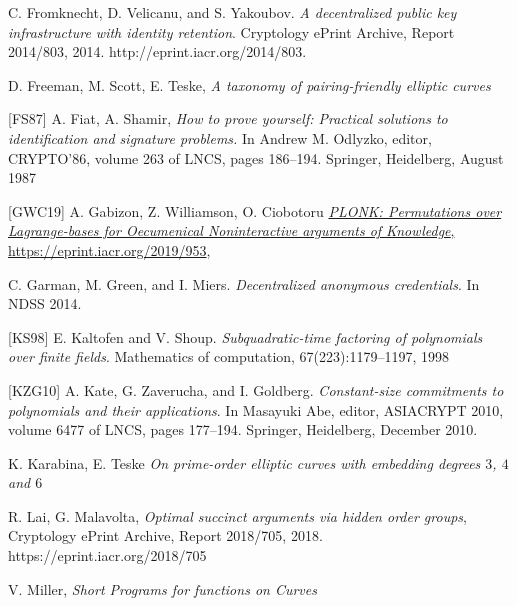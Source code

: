 \documentclass[11pt, lettersize, notitlepage, leqno, footskip=0.6cm]{article}
\newcommand{\noin}{\noindent}
\numberwithin{equation}{section}
\begin{document}
\noin [FVY14] C. Fromknecht, D. Velicanu, and S. Yakoubov. \textit{A decentralized public key infrastructure with identity retention}. Cryptology ePrint Archive, Report 2014/803, 2014. http://eprint.iacr.org/2014/803. \vspace{1mm}

\noin [FST06] D. Freeman, M. Scott, E. Teske, \textit{A taxonomy of pairing-friendly elliptic curves}\vspace{1mm}

\noin \hypertarget{FS}{[FS87]} A. Fiat, A. Shamir, \textit{How to prove yourself: Practical solutions to identification and signature problems.} In Andrew M. Odlyzko, editor, CRYPTO’86, volume 263 of LNCS, pages 186–194. Springer, Heidelberg, August 1987 \vspace{1mm}

\noin \hypertarget{PLONK}{[GWC19]} A. Gabizon, Z. Williamson, O. Ciobotoru \href{https://eprint.iacr.org/2019/953}{\textit{PLONK: Permutations over Lagrange-bases for Oecumenical Noninteractive arguments of Knowledge}, https://eprint.iacr.org/2019/953}, \vspace{1mm}

\noin [GGM14] C. Garman, M. Green, and I. Miers. \textit{Decentralized anonymous credentials}. In NDSS 2014. \vspace{1mm}

\noin \hypertarget{KS98}{[KS98]} E. Kaltofen and V. Shoup. \textit{Subquadratic-time factoring of polynomials over finite fields}. Mathematics of computation, 67(223):1179–1197, 1998 \vspace{1mm}

\noin \hypertarget{KZG}{[KZG10]} A. Kate, G. Zaverucha, and I. Goldberg. \textit{Constant-size commitments to polynomials and their applications}. In Masayuki Abe, editor, ASIACRYPT 2010, volume 6477 of LNCS, pages 177–194. Springer, Heidelberg, December 2010. \vspace{1mm}

\noin [KT07] K. Karabina, E. Teske \textit{On prime-order elliptic curves with embedding degrees $3$, $4$ and $6$} \vspace{1mm}

\noin [LM18] R. Lai, G. Malavolta, \textit{Optimal succinct arguments via hidden order groups}, Cryptology ePrint Archive, Report 2018/705, 2018. https://eprint.iacr.org/2018/705 \vspace{1mm}

\noin [Mil86] V. Miller, \textit{Short Programs for functions on Curves}\vspace{1mm}
\end{document}
